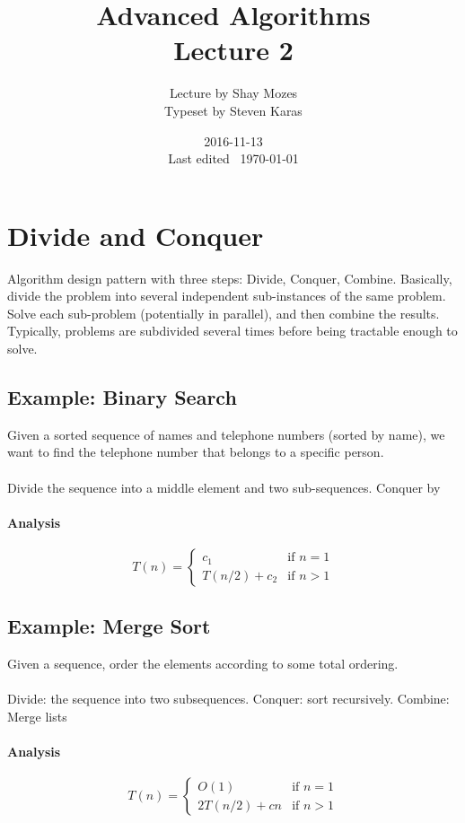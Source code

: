 \documentclass[a4paper]{article}
\title{Advanced Algorithms\\\large Lecture 2}
\date{2016-11-13 \\ Last edited \currenttime\ \today}
\author{Lecture by Shay Mozes\\Typeset by Steven Karas}
\begin{document}
\maketitle

\section{Divide and Conquer}
Algorithm design pattern with three steps: Divide, Conquer, Combine. Basically, divide the problem into several independent sub-instances of the same problem. Solve each sub-problem (potentially in parallel), and then combine the results. Typically, problems are subdivided several times before being tractable enough to solve.

\subsection{Example: Binary Search}
Given a sorted sequence of names and telephone numbers (sorted by name), we want to find the telephone number that belongs to a specific person.

\paragraph{}
Divide the sequence into a middle element and two sub-sequences. Conquer by 

\paragraph{Analysis}
\[
T(n)=
\begin{cases}
c_1 & \text{if }n=1\\
T(n/2)+c_2 & \text{if }n>1
\end{cases}
\]

\subsection{Example: Merge Sort}

Given a sequence, order the elements according to some total ordering.

\paragraph{}
Divide: the sequence into two subsequences. Conquer: sort recursively. Combine: Merge lists

\paragraph{Analysis}
\[
T(n)=
\begin{cases}
O(1) & \text{if }n=1\\
2T(n/2)+cn & \text{if }n>1
\end{cases}
\]
\end{document}
